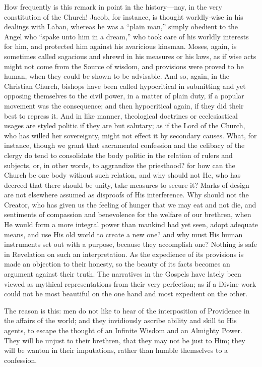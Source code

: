 How frequently is this remark in point in the history—nay, in the
very constitution of the Church! Jacob, for instance, is thought
worldly-wise in his dealings with Laban, whereas he was a ``plain
man,'' simply obedient to the Angel who ``spake unto him in a
dream,'' who took care of his worldly interests for him, and
protected him against his avaricious kinsman. Moses, again, is
sometimes called sagacious and shrewd in his measures or his laws, as
if wise acts might not come from the Source of wisdom, and provisions
were proved to be human, when they could be shown to be advisable. And
so, again, in the Christian Church, bishops have been called
hypocritical in submitting and yet opposing themselves to the civil
power, in a matter of plain duty, if a popular movement was the
consequence; and then hypocritical again, if they did their best to
repress it. And in like manner, theological doctrines or
ecclesiastical usages are styled politic if they are but salutary; as
if the Lord of the Church, who has willed her sovereignty, might not
effect it by secondary causes. What, for instance, though we grant
that sacramental confession and the celibacy of the clergy do tend to
consolidate the body politic in the relation of rulers and subjects,
or, in other words, to aggrandize the priesthood? for how can the
Church be one body without such relation, and why should not He, who
has decreed that there should be unity, take measures to secure it?
Marks of design are not elsewhere assumed as disproofs of His
interference. Why should not the Creator, who has given us the feeling
of hunger that we may eat and not die, and sentiments of compassion
and benevolence for the welfare of our brethren, when He would form a
more integral power than mankind had yet seen, adopt adequate means,
and use His old world to create a new one? and why must His human
instruments set out with a purpose, because they accomplish one?
Nothing is safe in Revelation on such an interpretation. As the
expedience of its provisions is made an objection to their honesty, so
the beauty of its facts becomes an argument against their truth. The
narratives in the Gospels have lately been viewed as mythical
representations from their very perfection; as if a Divine work could
not be most beautiful on the one hand and most expedient on the other.

The reason is this: men do not like to hear of the interposition of
Providence in the affairs of the world; and they invidiously ascribe
ability and skill to His agents, to escape the thought of an Infinite
Wisdom and an Almighty Power. They will be unjust to their brethren,
that they may not be just to Him; they will be wanton in their
imputations, rather than humble themselves to a confession.

